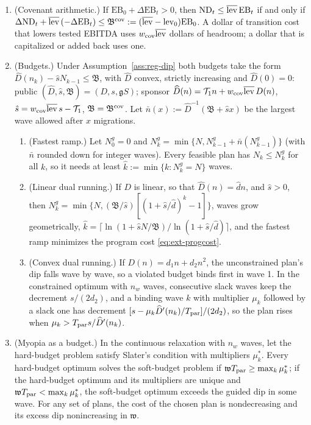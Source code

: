 \begin{proposition}\label{prop:reg-dip}
\begin{enumerate}
\item[(a)] (Covenant arithmetic.) If $\mathrm{EB}_0+\Delta\mathrm{EB}_t>0$, then $\mathrm{ND}_t\le\overline{\rm lev}\,\mathrm{EB}_t$ if and only if $\Delta\mathrm{ND}_t+\overline{\rm lev}\,(-\Delta\mathrm{EB}_t)\le\mathfrak B^{\rm cov}:=(\overline{\rm lev}-{\rm lev}_0)\mathrm{EB}_0$. A dollar of transition cost that lowers tested EBITDA uses $w_{\rm cov}\overline{\rm lev}$ dollars of headroom; a dollar that is capitalized or added back uses one.
\item[(b)] (Budgets.) Under Assumption~\ref{ass:reg-dip} both budgets take the form $\widehat D(n_k)-\hat sN_{k-1}\le\mathfrak B$, with $\widehat D$ convex, strictly increasing and $\widehat D(0)=0$: public $(\widehat D,\hat s,\mathfrak B)=(D,s,\mathfrak gS)$; sponsor $\widehat D(n)=\mathcal T_1n+w_{\rm cov}\overline{\rm lev}\,D(n)$, $\hat s=w_{\rm cov}\overline{\rm lev}\,s-\mathcal T_1$, $\mathfrak B=\mathfrak B^{\rm cov}$. Let $\bar n(x):=\widehat D^{-1}(\mathfrak B+\hat sx)$ be the largest wave allowed after $x$ migrations.
\begin{enumerate}
\item[(i)] (Fastest ramp.) Let $N^g_0=0$ and $N^g_k=\min\{N,N^g_{k-1}+\bar n(N^g_{k-1})\}$ (with $\bar n$ rounded down for integer waves). Every feasible plan has $N_k\le N^g_k$ for all $k$, so it needs at least $\hat k:=\min\{k:N^g_k=N\}$ waves.
\item[(ii)] (Linear dual running.) If $D$ is linear, so that $\widehat D(n)=\hat dn$, and $\hat s>0$, then $N^g_k=\min\{N,(\mathfrak B/\hat s)[(1+\hat s/\hat d)^k-1]\}$, waves grow geometrically, $\hat k=\lceil\ln(1+\hat sN/\mathfrak B)/\ln(1+\hat s/\hat d)\rceil$, and the fastest ramp minimizes the program cost \eqref{eq:ext-progcost}.
\item[(iii)] (Convex dual running.) If $D(n)=d_1n+d_2n^2$, the unconstrained plan's dip falls wave by wave, so a violated budget binds first in wave 1. In the constrained optimum with $n_w$ waves, consecutive slack waves keep the decrement $s/(2d_2)$, and a binding wave $k$ with multiplier $\mu_k$ followed by a slack one has decrement $[s-\mu_k\widehat D'(n_k)/T_{\rm par}]/(2d_2)$, so the plan rises when $\mu_k>T_{\rm par}s/\widehat D'(n_k)$.
\end{enumerate}
\item[(c)] (Myopia as a budget.) In the continuous relaxation with $n_w$ waves, let the hard-budget problem satisfy Slater's condition with multipliers $\mu^*_k$. Every hard-budget optimum solves the soft-budget problem if $\mathfrak w T_{\rm par}\ge\max_k\mu^*_k$; if the hard-budget optimum and its multipliers are unique and $\mathfrak w T_{\rm par}<\max_k\mu^*_k$, the soft-budget optimum exceeds the guided dip in some wave. For any set of plans, the cost of the chosen plan is nondecreasing and its excess dip nonincreasing in $\mathfrak w$.

\end{enumerate}
\end{proposition}
